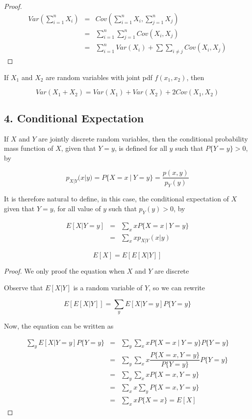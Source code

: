 \begin{proof}
	\begin{eqnarray*}
		Var\left(\sum^n_{i = 1}X_i\right) &=& Cov\left(\sum^n_{i = 1}X_i,\sum^n_{j = 1}X_j\right) \\
		&=& \sum^{n}_{i = 1}\sum^{n}_{j = 1}Cov(X_i,X_j)\\
		&=& \sum^n_{i = 1}Var(X_i) + \sum\sum_{i \neq j}Cov(X_i,X_j)
	\end{eqnarray*}
\end{proof}

\begin{cor*}
	If $X_1$ and $X_2$ are random variables with joint pdf $f(x_1,x_2)$, then 
	
	$$Var(X_1 + X_2) = Var(X_1) + Var(X_2) + 2Cov(X_1,X_2)$$
\end{cor*}


\newpage

\subsection*{4. Conditional Expectation}

\begin{defn}
	If $X$ and $Y$ are jointly discrete random variables, then the conditional probability mass function of $X$, given that $Y = y$, is defined for all $y$ such that $P\{Y = y \} > 0$, by
	
	$$p_{X|Y}(x|y) = P\{X = x ~|~ Y = y\} = \dfrac{p(x,y)}{p_Y(y)}$$
	
	It is therefore natural to define, in this case, the conditional expectation of $X$ given that $Y = y$, for all value of $y$ such that $p_Y(y) > 0$, by
	
	\begin{eqnarray*}
		E[X|Y =  y] &=& \sum_x xP\{X = x~|~ Y = y\}\\
		&=& \sum_x xp_{X|Y}(x|y)
	\end{eqnarray*}
\end{defn}

\begin{prop*}
	$$E[X] = E[E[X|Y]]$$
\end{prop*}

\begin{proof}
	We only proof the equation when $X$ and $Y$ are discrete
	
	Observe that $E[X|Y]$ is a random variable of $Y$, so we can rewrite
	
	$$E[E[X|Y]] = \sum_yE[X|Y = y]P\{Y = y\}$$
	
	Now, the equation can be written as
	
	\begin{eqnarray*}
		\sum_yE[X|Y = y]P\{Y = y\} &=& \sum_y\sum_xxP\{X = x ~|~ Y = y\}P\{Y = y\}\\
		&=& \sum_y\sum_xx\dfrac{P\{X = x,Y = y\}}{P\{Y = y\}}P\{Y = y\}\\
		&=& \sum_y\sum_xxP\{X = x,Y = y\}\\
		&=& \sum_x x \sum_y P\{X = x,Y = y\}\\
		&=& \sum_x xP\{ X = x\} = E[X]
	\end{eqnarray*}
\end{proof}

